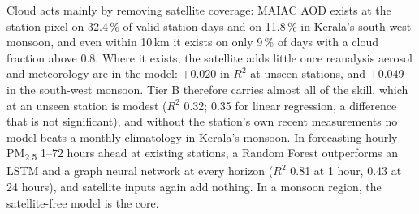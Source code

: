 \documentclass[12pt,a4wide]{report}
\newcommand{\pmtf}{PM\textsubscript{2.5}}                 %
\newcommand{\rsq}{\ensuremath{R^2}}
\theoremstyle{plain}
\theoremstyle{definition}
\theoremstyle{remark}
\begin{document}
Cloud acts mainly by removing satellite coverage: MAIAC AOD exists at the station pixel on 32.4\,\% of
valid station-days and on 11.8\,\% in Kerala's south-west monsoon, and even within 10\,km it exists on
only 9\,\% of days with a cloud fraction above 0.8. Where it exists, the satellite adds little once
reanalysis aerosol and meteorology are in the model: $+0.020$ in \rsq{} at unseen stations, and $+0.049$
in the south-west monsoon. Tier B therefore carries almost all of the skill, which at an unseen station
is modest (\rsq{} 0.32; 0.35 for linear regression, a difference that is not significant), and without
the station's own recent measurements no model beats a monthly climatology in Kerala's monsoon. In forecasting hourly \pmtf{} 1--72 hours
ahead at existing stations, a Random Forest outperforms an LSTM and a graph neural network
at every horizon (\rsq{} 0.81 at 1 hour, 0.43 at 24 hours), and satellite inputs again add nothing.
In a monsoon region, the satellite-free model is the core.

\clearpage



\tableofcontents
\clearpage
\listoffigures
\listoftables


\newpage

\setcounter{page}{1}















\printbibliography[heading=bibintoc, title={Bibliography}]
\end{document}

